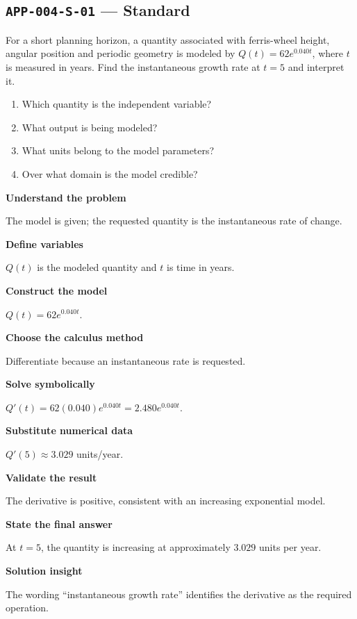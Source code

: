 \documentclass[11pt]{book}
\newcommand{\pid}[1]{\texttt{#1}}
\begin{document}
\subsection*{\pid{APP-004-S-01} — Standard}
\begin{problembox}
For a short planning horizon, a quantity associated with ferris-wheel height, angular position and periodic geometry is modeled by $Q(t)=62e^{0.040t}$, where $t$ is measured in years. Find the instantaneous growth rate at $t=5$ and interpret it.
\end{problembox}
\begin{promptbox}\begin{enumerate}
\item Which quantity is the independent variable?
\item What output is being modeled?
\item What units belong to the model parameters?
\item Over what domain is the model credible?
\end{enumerate}\end{promptbox}
\begin{solutionbox}
\textbf{Understand the problem}\par The model is given; the requested quantity is the instantaneous rate of change.\par\medskip
\textbf{Define variables}\par $Q(t)$ is the modeled quantity and $t$ is time in years.\par\medskip
\textbf{Construct the model}\par $Q(t)=62e^{0.040t}$.\par\medskip
\textbf{Choose the calculus method}\par Differentiate because an instantaneous rate is requested.\par\medskip
\textbf{Solve symbolically}\par $Q'(t)=62(0.040)e^{0.040t}=2.480e^{0.040t}$.\par\medskip
\textbf{Substitute numerical data}\par $Q'(5)\approx 3.029$ units/year.\par\medskip
\textbf{Validate the result}\par The derivative is positive, consistent with an increasing exponential model.\par\medskip
\textbf{State the final answer}\par At $t=5$, the quantity is increasing at approximately $3.029$ units per year.\par\medskip
\textbf{Solution insight}\par The wording “instantaneous growth rate” identifies the derivative as the required operation.\par\medskip
\end{solutionbox}
\end{document}
